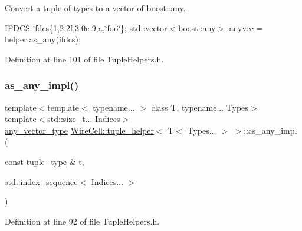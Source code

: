 Convert a tuple of types to a vector of boost\+::any.

I\+F\+D\+CS ifdcs\{1,2.\+2f,3.\+0e-\/9,\textquotesingle{}a\textquotesingle{},\char`\"{}foo\char`\"{}\}; std\+::vector$<$boost\+::any$>$ anyvec = helper.\+as\+\_\+any(ifdcs); 

Definition at line 101 of file Tuple\+Helpers.\+h.

\mbox{\label{struct_wire_cell_1_1tuple__helper_3_01_t_3_01_types_8_8_8_01_4_01_4_a92048a9ccf4531bc1576e8684573e487}} 
\subsubsection{\texorpdfstring{as\+\_\+any\+\_\+impl()}{as\_any\_impl()}}
{\footnotesize\ttfamily template$<$template$<$ typename... $>$ class T, typename... Types$>$ \\
template$<$std\+::size\+\_\+t... Indices$>$ \\
\hyperlink{struct_wire_cell_1_1tuple__helper_3_01_t_3_01_types_8_8_8_01_4_01_4_a09d92f40f36eccfe85165e6ab93a6217}{any\+\_\+vector\+\_\+type} \hyperlink{struct_wire_cell_1_1tuple__helper}{Wire\+Cell\+::tuple\+\_\+helper}$<$ T$<$ Types... $>$ $>$\+::as\+\_\+any\+\_\+impl (\begin{DoxyParamCaption}\item[{const \hyperlink{struct_wire_cell_1_1tuple__helper_3_01_t_3_01_types_8_8_8_01_4_01_4_aef55cc988f5f41eff16f4a116bbd5fc5}{tuple\+\_\+type} \&}]{t,  }\item[{\hyperlink{structstd_1_1index__sequence}{std\+::index\+\_\+sequence}$<$ Indices... $>$}]{ }\end{DoxyParamCaption})\hspace{0.3cm}{\ttfamily [inline]}}



Definition at line 92 of file Tuple\+Helpers.\+h.

\mbox{\label{struct_wire_cell_1_1tuple__helper_3_01_t_3_01_types_8_8_8_01_4_01_4_aac3be802651ad5c8f921c01857134f99}} 
